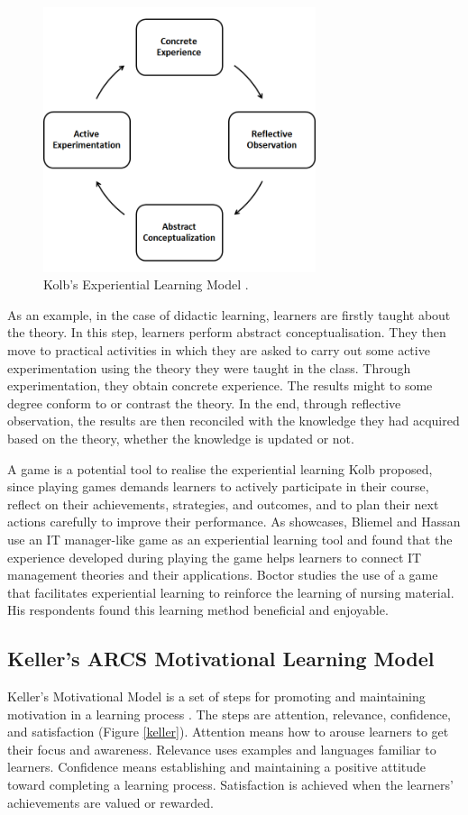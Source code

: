\documentclass[12pt, a4paper]{report}
\begin{document}
\begin{figure}[ht]
\centering
\includegraphics[width=8cm]{kolb}
\caption{Kolb's Experiential Learning Model \cite{kolb2014experiential}.}
\label{kolb}
\end{figure}

As an example, in the case of didactic learning, learners are firstly taught about the theory. In this step, learners perform abstract conceptualisation. They then move to practical activities in which they are asked to carry out some active experimentation using the theory they were taught in the class. Through experimentation, they obtain concrete experience. The results might to some degree conform to or contrast the theory. In the end, through reflective observation, the results are then reconciled with the knowledge they had acquired based on the theory, whether the knowledge is updated or not. 

A game is a potential tool to realise the experiential learning Kolb proposed, since playing games demands learners to actively participate in their course, reflect on their achievements, strategies, and outcomes, and to plan their next actions carefully to improve their performance. As showcases, Bliemel and Hassan \cite{bliemel2014game} use an IT manager-like game as an experiential learning tool and found that the experience developed during playing the game helps learners to connect IT management theories and their applications. Boctor \cite{boctor2013active} studies the use of a game that facilitates experiential learning to reinforce the learning of nursing material. His respondents found this learning method beneficial and enjoyable. 
 
\subsection{Keller's ARCS Motivational Learning Model}
Keller's Motivational Model is a set of steps for promoting and maintaining motivation in a learning process \cite{keller2010motivational}. The steps are attention, relevance, confidence, and satisfaction (Figure \ref{keller}). Attention means how to arouse learners to get their focus and awareness. Relevance uses examples and languages familiar to learners. Confidence means establishing and maintaining a positive attitude toward completing a learning process. Satisfaction is achieved when the learners' achievements are valued or rewarded. 
\end{document}
